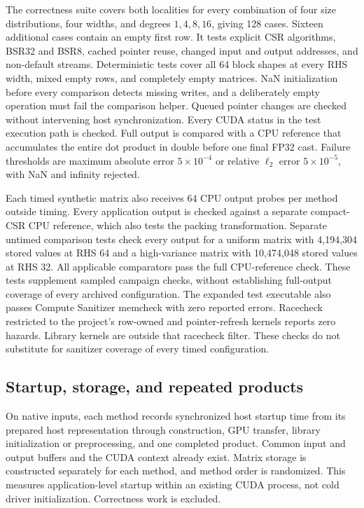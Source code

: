 \documentclass[10pt]{article}
\begin{document}
The correctness suite covers both localities for every combination of four
size distributions, four widths, and degrees \(1,4,8,16\), giving 128 cases.
Sixteen additional cases contain an empty first row. It tests explicit CSR algorithms, BSR32 and BSR8, cached pointer reuse,
changed input and output addresses, and non-default streams. Deterministic
tests cover all 64 block shapes at every RHS width, mixed empty rows,
and completely empty matrices. NaN initialization before every comparison
detects missing writes, and a deliberately empty operation must fail the
comparison helper. Queued pointer changes are checked without intervening
host synchronization. Every CUDA status in the test execution path is checked. Full output is compared with a CPU reference that accumulates the entire
dot product in double before one final FP32 cast. Failure thresholds are maximum absolute error \(5\times10^{-4}\)
or relative \(\ell_2\) error \(5\times10^{-5}\), with NaN and infinity rejected.

Each timed synthetic matrix also receives 64 CPU output probes per method
outside timing. Every application output is checked against a separate
compact-CSR CPU reference, which also tests the packing transformation.
Separate untimed comparison tests check every output for a uniform matrix
with 4,194,304 stored values at RHS 64 and a high-variance matrix with
10,474,048 stored values at RHS 32. All applicable comparators pass the
full CPU-reference check. These tests supplement sampled campaign checks,
without establishing full-output coverage of every archived configuration.
The expanded test executable also passes Compute Sanitizer memcheck with
zero reported errors. Racecheck restricted to the project's row-owned and pointer-refresh kernels
reports zero hazards. Library kernels are outside that racecheck filter.
These checks do not substitute for sanitizer coverage of every timed configuration.

\subsection{Startup, storage, and repeated products}
On native inputs, each method records synchronized host startup time from
its prepared host representation through construction, GPU transfer,
library initialization or preprocessing, and one completed product.
Common input and output buffers and the CUDA context already exist.
Matrix storage is constructed separately for each method, and method order
is randomized. This measures application-level startup within an existing
CUDA process, not cold driver initialization. Correctness work is excluded.
\end{document}
